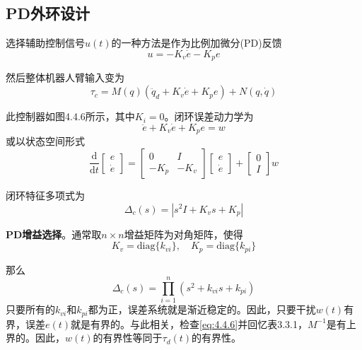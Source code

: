 \documentclass[UTF8]{ctexart}
\theoremstyle{definition}
\newcommand{\dd}{\mathrm{d}}
\begin{document}
\subsection{PD外环设计}

选择辅助控制信号$u(t)$的一种方法是作为比例加微分(PD)反馈
\begin{equation}\label{eq:4.4.14}
    u = -K_v\dot{e} - K_pe
\end{equation}

然后整体机器人臂输入变为
\begin{equation}\label{eq:4.4.15}
    \tau_c = M(q)(\ddot{q}_d + K_v\dot{e} + K_pe) + N(q, \dot{q})
\end{equation}

此控制器如图4.4.6所示，其中$K_i = 0$。闭环误差动力学为
\begin{equation}\label{eq:4.4.16}
    \ddot{e} + K_v\dot{e} + K_pe = w
\end{equation}
或以状态空间形式
\begin{equation}\label{eq:4.4.17}
    \frac{\dd}{\dd t}\begin{bmatrix} e \\ \dot{e} \end{bmatrix} = \begin{bmatrix} 0 & I \\ -K_p & -K_v \end{bmatrix}\begin{bmatrix} e \\ \dot{e} \end{bmatrix} + \begin{bmatrix} 0 \\ I \end{bmatrix}w
\end{equation}

闭环特征多项式为
\begin{equation}\label{eq:4.4.18}
    \Delta_c(s) = |s^2 I + K_v s + K_p|
\end{equation}

\textbf{PD增益选择}。通常取$n \times n$增益矩阵为对角矩阵，使得
\begin{equation}\label{eq:4.4.19}
    K_v = \mathrm{diag}\{k_{vi}\}, \quad K_p = \mathrm{diag}\{k_{pi}\}
\end{equation}

那么
\begin{equation}\label{eq:4.4.20}
    \Delta_c(s) = \prod_{i=1}^{n}\left(s^2 + k_{vi} s + k_{pi}\right)
\end{equation}
只要所有的$k_{vi}$和$k_{pi}$都为正，误差系统就是渐近稳定的。因此，只要干扰$w(t)$有界，误差$e(t)$就是有界的。与此相关，检查\eqref{eq:4.4.6}并回忆表3.3.1，$M^{-1}$是有上界的。因此，$w(t)$的有界性等同于$\tau_d(t)$的有界性。
\end{document}
